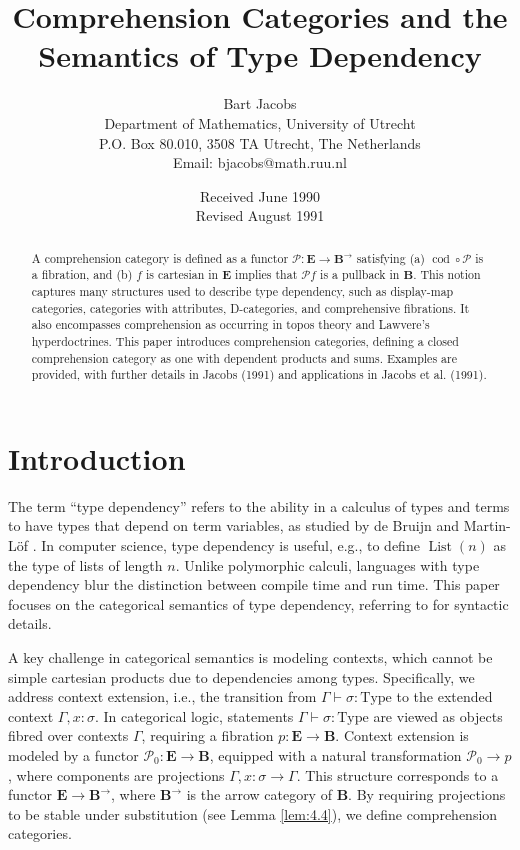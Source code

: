 \documentclass{article}
\title{Comprehension Categories and the Semantics of Type Dependency}
\author{Bart Jacobs \\ Department of Mathematics, University of Utrecht \\ P.O. Box 80.010, 3508 TA Utrecht, The Netherlands \\ Email: bjacobs@math.ruu.nl}
\date{Received June 1990 \\ Revised August 1991}
\theoremstyle{plain}
\theoremstyle{remark}
\begin{document}
\maketitle

\begin{abstract}
A comprehension category is defined as a functor $\mathscr{P}: \mathbf{E} \to \mathbf{B}^{\to}$ satisfying (a) $\operatorname{cod} \circ \mathscr{P}$ is a fibration, and (b) $f$ is cartesian in $\mathbf{E}$ implies that $\mathscr{P} f$ is a pullback in $\mathbf{B}$. This notion captures many structures used to describe type dependency, such as display-map categories, categories with attributes, D-categories, and comprehensive fibrations. It also encompasses comprehension as occurring in topos theory and Lawvere's hyperdoctrines. This paper introduces comprehension categories, defining a closed comprehension category as one with dependent products and sums. Examples are provided, with further details in Jacobs (1991) and applications in Jacobs et al. (1991).
\end{abstract}

\tableofcontents

\section{Introduction}

The term ``type dependency'' refers to the ability in a calculus of types and terms to have types that depend on term variables, as studied by de Bruijn \cite{deBruijn1970} and Martin-L\"of \cite{MartinLof1984}. In computer science, type dependency is useful, e.g., to define $\operatorname{List}(n)$ as the type of lists of length $n$. Unlike polymorphic calculi, languages with type dependency blur the distinction between compile time and run time. This paper focuses on the categorical semantics of type dependency, referring to \cite{MartinLof1984, Troelstra1986} for syntactic details.

A key challenge in categorical semantics is modeling contexts, which cannot be simple cartesian products due to dependencies among types. Specifically, we address context extension, i.e., the transition from $\Gamma \vdash \sigma : \text{Type}$ to the extended context $\Gamma, x : \sigma$. In categorical logic, statements $\Gamma \vdash \sigma : \text{Type}$ are viewed as objects fibred over contexts $\Gamma$, requiring a fibration $p : \mathbf{E} \to \mathbf{B}$. Context extension is modeled by a functor $\mathscr{P}_0 : \mathbf{E} \to \mathbf{B}$, equipped with a natural transformation $\mathscr{P}_0 \to p$, where components are projections $\Gamma, x : \sigma \to \Gamma$. This structure corresponds to a functor $\mathbf{E} \to \mathbf{B}^{\to}$, where $\mathbf{B}^{\to}$ is the arrow category of $\mathbf{B}$. By requiring projections to be stable under substitution (see Lemma \ref{lem:4.4}), we define comprehension categories.
\end{document}
